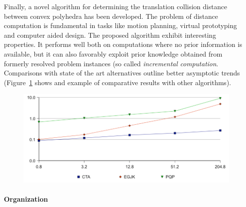 Finally, a novel algorithm for determining the translation collision
distance between convex polyhedra has been developed. The problem of
distance computation is fundamental in tasks like motion planning,
virtual prototyping and computer aided design. The proposed
algorithm exhibit interesting properties. It performs well both on
computations where no prior information is available, but it can
also favorably exploit prior knowledge obtained from formerly
resolved problem instances (so called {\em incremental computation}.
Comparisons with state of the art alternatives outline better
asymptotic trends (Figure~\ref{fig:Carpin_pic1} shows and example of
comparative results with other algorithms).



\begin{figure}[ht]
\begin{center}
     \includegraphics[width=\hsize]{Carpin_Figure_CTA.pdf}
    \label{fig:Carpin_pic1}
\end{center}
\end{figure}





\paragraph{Organization}

